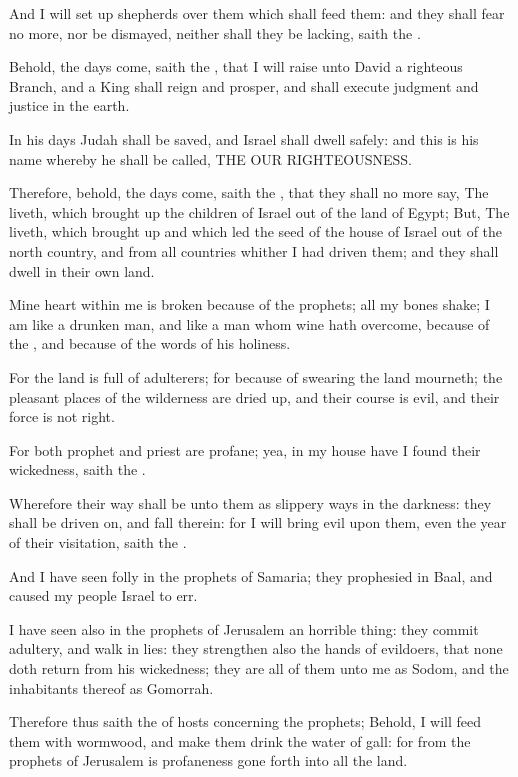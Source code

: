 \Verse And I will set up shepherds over them which shall feed them: and they shall fear no more, nor be dismayed, neither shall they be lacking, saith the \LORD.

\Verse Behold, the days come, saith the \LORD, that I will raise unto David a righteous Branch, and a King shall reign and prosper, and shall execute judgment and justice in the earth.

\Verse In his days Judah shall be saved, and Israel shall dwell safely: and this is his name whereby he shall be called, THE \LORD OUR RIGHTEOUSNESS.

\Verse Therefore, behold, the days come, saith the \LORD, that they shall no more say, The \LORD liveth, which brought up the children of Israel out of the land of Egypt; \Verse But, The \LORD liveth, which brought up and which led the seed of the house of Israel out of the north country, and from all countries whither I had driven them; and they shall dwell in their own land.

\Verse Mine heart within me is broken because of the prophets; all my bones shake; I am like a drunken man, and like a man whom wine hath overcome, because of the \LORD, and because of the words of his holiness.

\Verse For the land is full of adulterers; for because of swearing the land mourneth; the pleasant places of the wilderness are dried up, and their course is evil, and their force is not right.

\Verse For both prophet and priest are profane; yea, in my house have I found their wickedness, saith the \LORD.

\Verse Wherefore their way shall be unto them as slippery ways in the darkness: they shall be driven on, and fall therein: for I will bring evil upon them, even the year of their visitation, saith the \LORD.

\Verse And I have seen folly in the prophets of Samaria; they prophesied in Baal, and caused my people Israel to err.

\Verse I have seen also in the prophets of Jerusalem an horrible thing: they commit adultery, and walk in lies: they strengthen also the hands of evildoers, that none doth return from his wickedness; they are all of them unto me as Sodom, and the inhabitants thereof as Gomorrah.

\Verse Therefore thus saith the \LORD of hosts concerning the prophets; Behold, I will feed them with wormwood, and make them drink the water of gall: for from the prophets of Jerusalem is profaneness gone forth into all the land.

